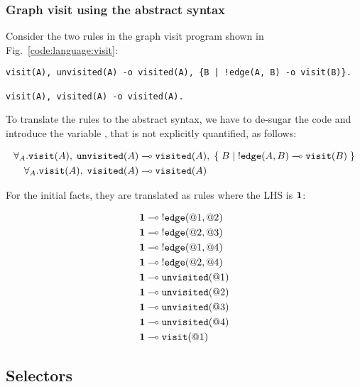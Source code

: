 \subsubsection{Graph visit using the abstract syntax}\label{visit:ast}

Consider the two rules in the graph visit program shown in
Fig.~\ref{code:language:visit}:

\nopagebreak

\begin{Verbatim}[fontsize=\codesize]
visit(A), unvisited(A) -o visited(A), {B | !edge(A, B) -o visit(B)}.

visit(A), visited(A) -o visited(A).
\end{Verbatim}

To translate the rules to the abstract syntax, we have to de-sugar the code and
introduce the variable , that is not explicitly quantified, as follows:

\nopagebreak

\begin{align}
\forall_A. \mathtt{visit}(A), \; \mathtt{unvisited}(A) \multimap & \;
\mathtt{visited}(A), \; \{ \; B \; | \; {!}\mathtt{edge}(A, B) \multimap \mathtt{visit}(B) \; \}\\
\forall_A. \mathtt{visit}(A), \; \mathtt{visited}(A) \multimap & \;
\mathtt{visited}(A)
\end{align}

For the initial facts, they are translated as rules where the LHS is $\mathbf{1}$:

\nopagebreak

\begin{align}
\mathbf{1} \multimap \; & {!} \mathtt{edge}(@1, @2) \\
\mathbf{1} \multimap \; & {!} \mathtt{edge}(@2, @3) \\
\mathbf{1} \multimap \; & {!} \mathtt{edge}(@1, @4) \\
\mathbf{1} \multimap \; & {!} \mathtt{edge}(@2, @4) \\
\mathbf{1} \multimap \; & \mathtt{unvisited}(@1)  \\
\mathbf{1} \multimap \; & \mathtt{unvisited}(@2) \\
\mathbf{1} \multimap \; & \mathtt{unvisited}(@3) \\
\mathbf{1} \multimap \; & \mathtt{unvisited}(@4) \\
\mathbf{1} \multimap \; & \mathtt{visit}(@1)
\end{align}

\subsection{Selectors}\label{section:language:selector}

